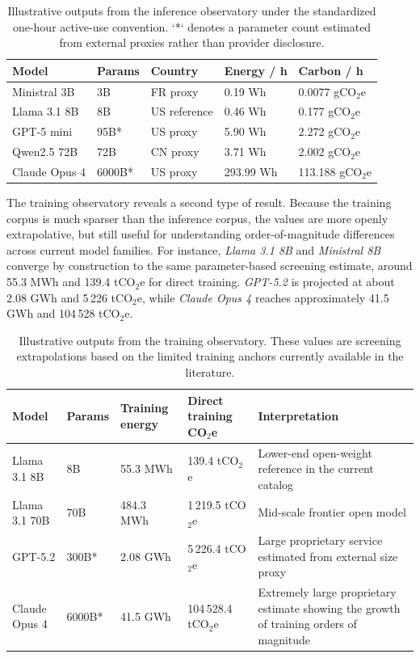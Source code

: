 \documentclass[11pt,a4paper]{article}
\begin{document}
\begin{table}[htbp]
\centering
\small
\begin{tabularx}{\textwidth}{|L{3.1cm}|L{1.4cm}|L{1.4cm}|L{2.0cm}|L{1.9cm}|}
\hline
Model & Params & Country & Energy / h & Carbon / h \\
\hline
Ministral 3B & 3B & FR proxy & 0.19 Wh & 0.0077 gCO$_2$e \\
\hline
Llama 3.1 8B & 8B & US reference & 0.46 Wh & 0.177 gCO$_2$e \\
\hline
GPT-5 mini & 95B* & US proxy & 5.90 Wh & 2.272 gCO$_2$e \\
\hline
Qwen2.5 72B & 72B & CN proxy & 3.71 Wh & 2.002 gCO$_2$e \\
\hline
Claude Opus 4 & 6000B* & US proxy & 293.99 Wh & 113.188 gCO$_2$e \\
\hline
\end{tabularx}
\caption{Illustrative outputs from the inference observatory under the standardized one-hour active-use convention. `*` denotes a parameter count estimated from external proxies rather than provider disclosure.}
\label{tab:observatory-inference}
\end{table}

The training observatory reveals a second type of result. Because the training corpus is much sparser than the inference corpus, the values are more openly extrapolative, but still useful for understanding order-of-magnitude differences across current model families. For instance, \emph{Llama 3.1 8B} and \emph{Ministral 8B} converge by construction to the same parameter-based screening estimate, around 55.3 MWh and 139.4 tCO$_2$e for direct training. \emph{GPT-5.2} is projected at about 2.08 GWh and 5\,226 tCO$_2$e, while \emph{Claude Opus 4} reaches approximately 41.5 GWh and 104\,528 tCO$_2$e.

\begin{table}[htbp]
\centering
\small
\begin{tabularx}{\textwidth}{|L{3.2cm}|L{1.4cm}|L{2.0cm}|L{2.3cm}|Y|}
\hline
Model & Params & Training energy & Direct training CO$_2$e & Interpretation \\
\hline
Llama 3.1 8B & 8B & 55.3 MWh & 139.4 tCO$_2$e & Lower-end open-weight reference in the current catalog \\
\hline
Llama 3.1 70B & 70B & 484.3 MWh & 1\,219.5 tCO$_2$e & Mid-scale frontier open model \\
\hline
GPT-5.2 & 300B* & 2.08 GWh & 5\,226.4 tCO$_2$e & Large proprietary service estimated from external size proxy \\
\hline
Claude Opus 4 & 6000B* & 41.5 GWh & 104\,528.4 tCO$_2$e & Extremely large proprietary estimate showing the growth of training orders of magnitude \\
\hline
\end{tabularx}
\caption{Illustrative outputs from the training observatory. These values are screening extrapolations based on the limited training anchors currently available in the literature.}
\label{tab:observatory-training}
\end{table}
\end{document}
